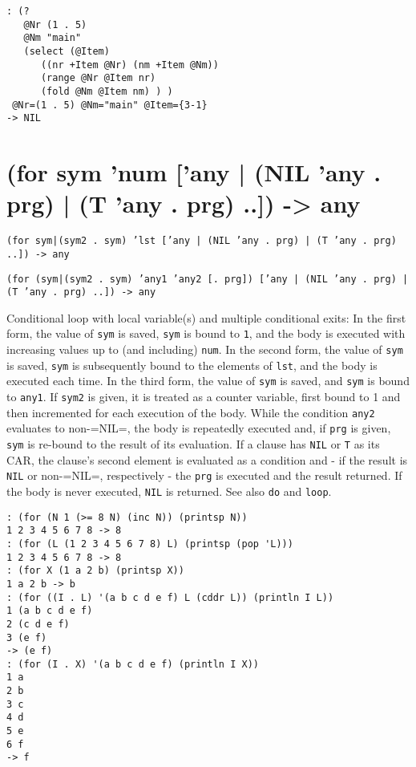 {{{{{{\begin{verbatim}
: (?
   @Nr (1 . 5)
   @Nm "main"
   (select (@Item)
      ((nr +Item @Nr) (nm +Item @Nm))
      (range @Nr @Item nr)
      (fold @Nm @Item nm) ) )
 @Nr=(1 . 5) @Nm="main" @Item={3-1}
-> NIL
\end{verbatim}

 
\section{(for sym 'num ['any | (NIL 'any . prg) | (T 'any . prg) ..]) -> any}
\label{sec-8-1-6-20}


\texttt{(for sym|(sym2 . sym) 'lst ['any | (NIL 'any . prg) | (T 'any . prg) ..]) -> any}

\texttt{(for (sym|(sym2 . sym) 'any1 'any2 [. prg]) ['any | (NIL 'any . prg) | (T 'any . prg) ..]) -> any}

Conditional loop with local variable(s) and multiple conditional exits:
In the first form, the value of \texttt{sym} is saved, \texttt{sym} is bound to \texttt{1},
and the body is executed with increasing values up to (and including)
\texttt{num}. In the second form, the value of \texttt{sym} is saved, \texttt{sym} is
subsequently bound to the elements of \texttt{lst}, and the body is executed
each time. In the third form, the value of \texttt{sym} is saved, and \texttt{sym} is
bound to \texttt{any1}. If \texttt{sym2} is given, it is treated as a counter
variable, first bound to 1 and then incremented for each execution of
the body. While the condition \texttt{any2} evaluates to non-=NIL=, the body is
repeatedly executed and, if \texttt{prg} is given, \texttt{sym} is re-bound to the
result of its evaluation. If a clause has \texttt{NIL} or \texttt{T} as its CAR, the
clause's second element is evaluated as a condition and - if the result
is \texttt{NIL} or non-=NIL=, respectively - the \texttt{prg} is executed and the
result returned. If the body is never executed, \texttt{NIL} is returned. See
also \texttt{do} and \texttt{loop}.


\begin{verbatim}
: (for (N 1 (>= 8 N) (inc N)) (printsp N))
1 2 3 4 5 6 7 8 -> 8
: (for (L (1 2 3 4 5 6 7 8) L) (printsp (pop 'L)))
1 2 3 4 5 6 7 8 -> 8
: (for X (1 a 2 b) (printsp X))
1 a 2 b -> b
: (for ((I . L) '(a b c d e f) L (cddr L)) (println I L))
1 (a b c d e f)
2 (c d e f)
3 (e f)
-> (e f)
: (for (I . X) '(a b c d e f) (println I X))
1 a
2 b
3 c
4 d
5 e
6 f
-> f
\end{verbatim}

}}}}}}
